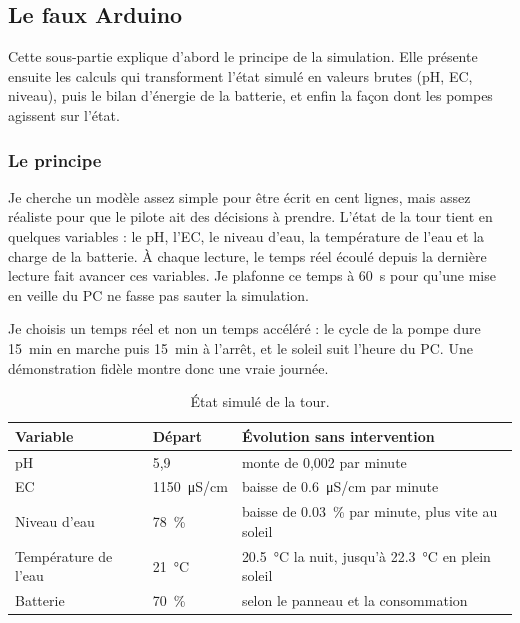 \subsection{Le faux Arduino}

Cette sous-partie explique d'abord le principe de la simulation. Elle présente ensuite les calculs qui transforment l'état simulé en valeurs brutes (pH, EC, niveau), puis le bilan d'énergie de la batterie, et enfin la façon dont les pompes agissent sur l'état.

\subsubsection*{Le principe}

Je cherche un modèle assez simple pour être écrit en cent lignes, mais assez réaliste pour que le pilote ait des décisions à prendre. L'état de la tour tient en quelques variables : le pH, l'EC, le niveau d'eau, la température de l'eau et la charge de la batterie. À chaque lecture, le temps réel écoulé depuis la dernière lecture fait avancer ces variables. Je plafonne ce temps à \qty{60}{s} pour qu'une mise en veille du PC ne fasse pas sauter la simulation.

Je choisis un temps réel et non un temps accéléré : le cycle de la pompe dure \qty{15}{min} en marche puis \qty{15}{min} à l'arrêt, et le soleil suit l'heure du PC. Une démonstration fidèle montre donc une vraie journée.

\begin{table}[H]
\centering
\small
\begin{tabularx}{\textwidth}{|l|l|Y|}
\hline
\textbf{Variable} & \textbf{Départ} & \textbf{Évolution sans intervention} \\
\hline
pH & 5,9 & monte de 0,002 par minute \\
\hline
EC & \qty{1150}{\micro S/cm} & baisse de \qty{0,6}{\micro S/cm} par minute \\
\hline
Niveau d'eau & \qty{78}{\percent} & baisse de \qty{0,03}{\percent} par minute, plus vite au soleil \\
\hline
Température de l'eau & \qty{21}{\celsius} & \qty{20,5}{\celsius} la nuit, jusqu'à \qty{22,3}{\celsius} en plein soleil \\
\hline
Batterie & \qty{70}{\percent} & selon le panneau et la consommation \\
\hline
\end{tabularx}
\caption{État simulé de la tour.}
\end{table}

